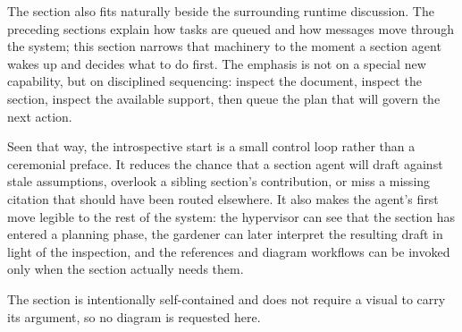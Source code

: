The section also fits naturally beside the surrounding runtime discussion. The preceding sections explain how tasks are queued and how messages move through the system; this section narrows that machinery to the moment a section agent wakes up and decides what to do first. The emphasis is not on a special new capability, but on disciplined sequencing: inspect the document, inspect the section, inspect the available support, then queue the plan that will govern the next action.

Seen that way, the introspective start is a small control loop rather than a ceremonial preface. It reduces the chance that a section agent will draft against stale assumptions, overlook a sibling section's contribution, or miss a missing citation that should have been routed elsewhere. It also makes the agent's first move legible to the rest of the system: the hypervisor can see that the section has entered a planning phase, the gardener can later interpret the resulting draft in light of the inspection, and the references and diagram workflows can be invoked only when the section actually needs them.

The section is intentionally self-contained and does not require a visual to carry its argument, so no diagram is requested here.
